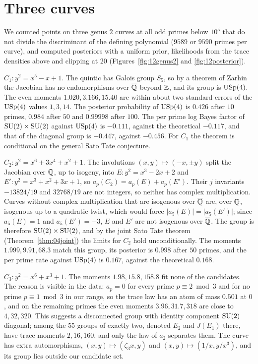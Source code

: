 \section{Three curves}

We counted points on three genus $2$ curves at all odd primes below $10^5$ that do not divide the discriminant of the defining polynomial ($9589$ or $9590$ primes per curve), and computed posteriors with a uniform prior, likelihoods from the trace densities above and clipping at $20$ (Figures~\ref{fig:12genus2} and \ref{fig:12posterior}).

$C_1:y^2=x^5-x+1$. The quintic has Galois group $S_5$, so by a theorem of Zarhin \cite{zarhin2000} the Jacobian has no endomorphisms over $\overline{\mathbb{Q}}$ beyond $\mathbb{Z}$, and its group is $\mathrm{USp}(4)$. The even moments $1.020,3.166,15.40$ are within about two standard errors of the $\mathrm{USp}(4)$ values $1,3,14$. The posterior probability of $\mathrm{USp}(4)$ is $0.426$ after $10$ primes, $0.984$ after $50$ and $0.99998$ after $100$. The per prime log Bayes factor of $\mathrm{SU}(2)\times\mathrm{SU}(2)$ against $\mathrm{USp}(4)$ is $-0.111$, against the theoretical $-0.117$, and that of the diagonal group is $-0.447$, against $-0.456$. For $C_1$ the theorem is conditional on the general Sato Tate conjecture.

$C_2:y^2=x^6+3x^4+x^2+1$. The involutions $(x,y)\mapsto(-x,\pm y)$ split the Jacobian over $\mathbb{Q}$, up to isogeny, into $E:y^2=x^3-2x+2$ and $E':y^2=x^3+x^2+3x+1$, so $a_p(C_2)=a_p(E)+a_p(E')$. Their $j$ invariants $-13824/19$ and $32768/19$ are not integers, so neither has complex multiplication. Curves without complex multiplication that are isogenous over $\overline{\mathbb{Q}}$ are, over $\mathbb{Q}$, isogenous up to a quadratic twist, which would force $|a_5(E)|=|a_5(E')|$; since $a_5(E)=1$ and $a_5(E')=-3$, $E$ and $E'$ are not isogenous over $\overline{\mathbb{Q}}$. The group is therefore $\mathrm{SU}(2)\times\mathrm{SU}(2)$, and by the joint Sato Tate theorem (Theorem~\ref{thm:04joint}) the limits for $C_2$ hold unconditionally. The moments $1.999,9.91,68.3$ match this group, its posterior is $0.998$ after $50$ primes, and the per prime rate against $\mathrm{USp}(4)$ is $0.167$, against the theoretical $0.168$.

$C_3:y^2=x^6+x^3+1$. The moments $1.98,15.8,158.8$ fit none of the candidates. The reason is visible in the data: $a_p=0$ for every prime $p\equiv2\bmod3$ and for no prime $p\equiv1\bmod3$ in our range, so the trace law has an atom of mass $0.501$ at $0$, and on the remaining primes the even moments $3.96,31.7,318$ are close to $4,32,320$. This suggests a disconnected group with identity component $\mathrm{SU}(2)$ diagonal; among the $55$ groups of \cite{fkrs2012} exactly two, denoted $E_2$ and $J(E_1)$ there, have trace moments $2,16,160$, and only the law of $a_2$ separates them. The curve has extra automorphisms, $(x,y)\mapsto(\zeta_3x,y)$ and $(x,y)\mapsto(1/x,y/x^3)$, and its group lies outside our candidate set.

